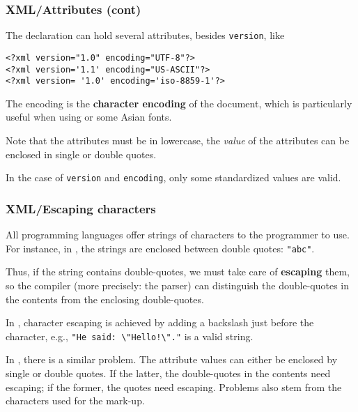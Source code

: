 %
\begin{frame}[containsverbatim]
\frametitle{XML/Attributes (cont)}

The declaration can hold several attributes, besides
\verb|version|, like
\begin{verbatim}
<?xml version="1.0" encoding="UTF-8"?>
<?xml version='1.1' encoding="US-ASCII"?>
<?xml version= '1.0' encoding='iso-8859-1'?>
\end{verbatim}
The encoding is the \textbf{character encoding} of the \XML document,
which is particularly useful when using \Unicode or some Asian
fonts. 

\bigskip

Note that the attributes must be in lowercase, the \emph{value} of the
attributes can be enclosed in single or double quotes. 

\bigskip

In the case of \verb|version| and \verb|encoding|, only some
standardized values are valid.

\end{frame}

%
\begin{frame}[containsverbatim]
\frametitle{XML/Escaping characters}

All programming languages offer strings of characters to the
programmer to use. For instance, in \Clang, the strings are enclosed
between double quotes: \verb|"abc"|. 

\bigskip

Thus, if the string contains double-quotes, we must take care of
\textbf{escaping} them, so the compiler (more precisely: the parser)
can distinguish the double-quotes in the contents from the enclosing
double-quotes. 

\bigskip

In \Clang, character escaping is achieved by adding a backslash just
before the character, e.g., \verb|"He said: \"Hello!\"."| is a valid
\Clang string.

\bigskip

In \XML, there is a similar problem. The attribute values can either
be enclosed by single or double quotes. If the latter, the
double-quotes in the contents need escaping; if the former, the quotes
need escaping. Problems also stem from the characters used for the
mark-up.

\end{frame}

